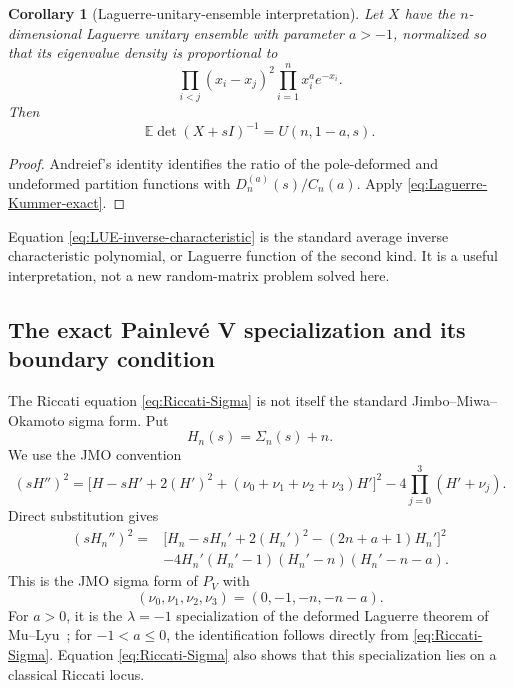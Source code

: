 \documentclass[11pt]{article}
\newtheorem{corollary}[theorem]{Corollary}
\theoremstyle{definition}
\theoremstyle{remark}
\begin{document}
\begin{corollary}[Laguerre-unitary-ensemble interpretation]
\label{cor:LUE-inverse-characteristic}
Let \(X\) have the \(n\)-dimensional Laguerre unitary ensemble with parameter
\(a>-1\), normalized so that its eigenvalue density is proportional to
\[
 \prod_{i<j}(x_i-x_j)^2\prod_{i=1}^n x_i^ae^{-x_i}.
\]
Then
\begin{equation}
 \boxed{\mathbb E\det(X+sI)^{-1}=U(n,1-a,s).}
 \label{eq:LUE-inverse-characteristic}
\end{equation}
\end{corollary}

\begin{proof}
Andreief's identity identifies the ratio of the pole-deformed and undeformed
partition functions with \(D_n^{(a)}(s)/C_n(a)\).  Apply
\eqref{eq:Laguerre-Kummer-exact}.
\end{proof}

Equation \eqref{eq:LUE-inverse-characteristic} is the standard average inverse
characteristic polynomial, or Laguerre function of the second kind.  It is a
useful interpretation, not a new random-matrix problem solved here.

\subsection{The exact Painlev\'e V specialization and its boundary condition}

The Riccati equation \eqref{eq:Riccati-Sigma} is not itself the standard
Jimbo--Miwa--Okamoto sigma form.  Put
\[
 H_n(s)=\Sigma_n(s)+n.
\]
We use the JMO convention~\cite[Appendix~C, Eq.~(C.45)]{JimboMiwa1981}
\[
 (sH'')^2=
 \bigl[H-sH'+2(H')^2+(\nu_0+\nu_1+\nu_2+\nu_3)H'\bigr]^2
 -4\prod_{j=0}^3(H'+\nu_j).
\]
Direct substitution gives
\begin{equation}
\begin{split}
 (sH_n'')^2={}&
 \bigl[H_n-sH_n'+2(H_n')^2-(2n+a+1)H_n'\bigr]^2\\
 &-4H_n'(H_n'-1)(H_n'-n)(H_n'-n-a).
\end{split}
\label{eq:JMO-PV}
\end{equation}
This is the JMO sigma form of \(P_V\) with
\[
 (\nu_0,\nu_1,\nu_2,\nu_3)=(0,-1,-n,-n-a).
\]
For \(a>0\), it is the \(\lambda=-1\) specialization of the deformed Laguerre
theorem of Mu--Lyu~\cite{MuLyu2025}; for \(-1<a\leq0\), the identification
follows directly from \eqref{eq:Riccati-Sigma}.  Equation
\eqref{eq:Riccati-Sigma} also shows that this specialization lies on a
classical Riccati locus.
\end{document}
